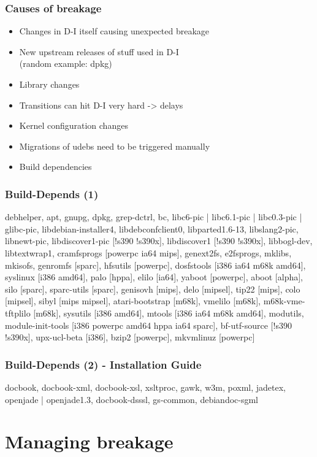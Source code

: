 \documentclass{beamer}
\begin{document}
\begin{frame}
  \frametitle{Causes of breakage}
	\begin{itemize}[<+->]
	\item
		Changes in D-I itself causing unexpected breakage
	\item
		New upstream releases of stuff used in D-I \\
		\small (random example: dpkg)
	\item
		Library changes
	\item
		Transitions can hit D-I very hard -> delays
	\item
		Kernel configuration changes
	\item
		Migrations of udebs need to be triggered manually
	\item
		Build dependencies
	\end{itemize}
\end{frame}

\begin{frame}
  \frametitle{Build-Depends (1)}
\small debhelper, apt, gnupg, dpkg, grep-dctrl, bc, libc6-pic | libc6.1-pic | libc0.3-pic | glibc-pic, libdebian-installer4, libdebconfclient0, libparted1.6-13, libslang2-pic, libnewt-pic, libdiscover1-pic [!s390 !s390x], libdiscover1 [!s390 !s390x], libbogl-dev, libtextwrap1, cramfsprogs [powerpc ia64 mips], genext2fs, e2fsprogs, mklibs, mkisofs, genromfs [sparc], hfsutils [powerpc], dosfstools [i386 ia64 m68k amd64], syslinux [i386 amd64], palo [hppa], elilo [ia64], yaboot [powerpc], aboot [alpha], silo [sparc], sparc-utils [sparc], genisovh [mips], delo [mipsel], tip22 [mips], colo [mipsel], sibyl [mips mipsel], atari-bootstrap [m68k], vmelilo [m68k], m68k-vme-tftplilo [m68k], sysutils [i386 amd64], mtools [i386 ia64 m68k amd64], modutils, module-init-tools [i386 powerpc amd64 hppa ia64 sparc], bf-utf-source [!s390 !s390x], upx-ucl-beta [i386], bzip2 [powerpc], mkvmlinuz [powerpc]
\end{frame}

\begin{frame}
  \frametitle{Build-Depends (2) - Installation Guide}
docbook, docbook-xml, docbook-xsl, xsltproc, gawk, w3m, poxml, jadetex, openjade | openjade1.3, docbook-dsssl, gs-common, debiandoc-sgml
\end{frame}


\section{Managing breakage}
\end{document}
